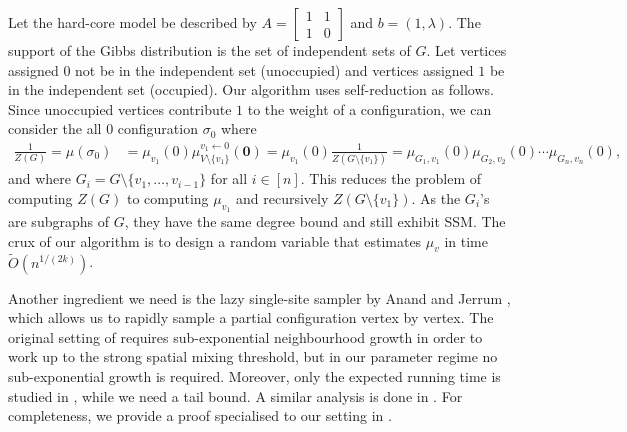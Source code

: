 \documentclass[10pt,a4paper]{article}
\begin{document}
Let the hard-core model be described by $A=\begin{bmatrix}1&1\\1&0\end{bmatrix}$ and $b=(1,\lambda)$.
The support of the Gibbs distribution is the set of independent sets of $G$. 
Let vertices assigned $0$ not be in the independent set (unoccupied) and vertices assigned $1$ be in the independent set (occupied). 
Our algorithm uses self-reduction \cite{JVV86} as follows.
Since unoccupied vertices contribute $1$ to the weight of a configuration, we can consider the all $0$ configuration $\sigma_0$ where 
\begin{align}
\label{hardcore-reduction}
\frac{1}{Z(G)}=\mu(\sigma_0)&=\mu_{v_1}(0)\mu_{V\setminus\{v_1\}}^{v_1\leftarrow0}(\mathbf{0})
=\mu_{v_1}(0)\frac{1}{Z(G\setminus\{v_1\})}
=\mu_{G_1,v_1}(0)\mu_{G_2,v_2}(0)\cdots\mu_{G_n,v_n}(0),
\end{align}
and where $G_i=G\setminus\{v_1,\ldots,v_{i-1}\}$ for all $i\in[n]$.
This reduces the problem of computing $Z(G)$ to computing $\mu_{v_1}$ and recursively $Z(G\setminus\{v_1\})$.
As the $G_i$'s are subgraphs of $G$, they have the same degree bound and still exhibit SSM.
The crux of our algorithm is to design a random variable that estimates $\mu_{v}$ in time $\widetilde{O}(n^{1/(2k)})$.



Another ingredient we need is the lazy single-site sampler by Anand and Jerrum \cite{AJ22},
which allows us to rapidly sample a partial configuration vertex by vertex. 
The original setting of \cite{AJ22} requires sub-exponential neighbourhood growth in order to work up to the strong spatial mixing threshold, but in our parameter regime no sub-exponential growth is required. 
Moreover, only the expected running time is studied in \cite{AJ22}, while we need a tail bound. 
A similar analysis is done in \cite[Appendix B]{FGWWY22}. 
For completeness, we provide a proof specialised to our setting in .
\end{document}
